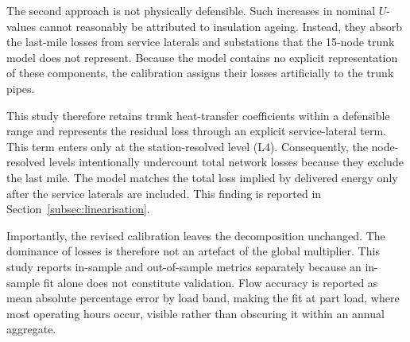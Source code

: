 \documentclass[a4paper,fleqn]{cas-sc}
\begin{document}
The second approach is not physically defensible. Such increases in nominal
$U$-values cannot reasonably be attributed to insulation ageing. Instead, they
absorb the last-mile losses from service laterals and substations that the 15-node
trunk model does not represent. Because the model contains no explicit representation
of these components, the calibration assigns their losses artificially to the trunk
pipes.

This study therefore retains trunk heat-transfer coefficients within a defensible
range and represents the residual loss through an explicit service-lateral term.
This term enters only at the station-resolved level (L4). Consequently, the
node-resolved levels intentionally undercount total network losses because they
exclude the last mile. The model matches the total loss implied by delivered energy
only after the service laterals are included. This finding is reported in
Section~\ref{subsec:linearisation}.

Importantly, the revised calibration leaves the decomposition unchanged. The
dominance of losses is therefore not an artefact of the global multiplier. This
study reports in-sample and out-of-sample metrics separately because an in-sample
fit alone does not constitute validation. Flow accuracy is reported as mean
absolute percentage error by load band, making the fit at part load, where most
operating hours occur, visible rather than obscuring it within an annual aggregate.
\end{document}

